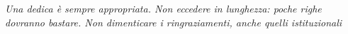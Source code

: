 \thispagestyle{empty}

\begin{footnotesize}
{ \textit{\noindent Una dedica è sempre appropriata. Non eccedere in lunghezza: poche righe dovranno bastare. Non dimenticare i ringraziamenti, anche quelli istituzionali} \par}
\end{footnotesize}
 

 